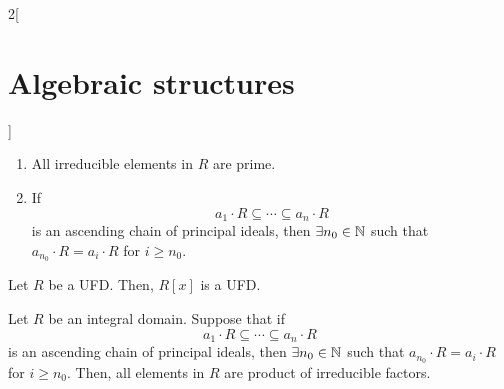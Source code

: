 \documentclass[../../../main.tex]{subfiles}
\begin{document}
\begin{multicols}{2}[\section{Algebraic structures}]
\begin{theorem}
\begin{enumerate}
        \item All irreducible elements in $R$ are prime.
        \item If $$a_1\cdot R\subseteq\cdots\subseteq a_n\cdot R $$ is an ascending chain of principal ideals, then $\exists n_0\in\mathbb{N}$ such that $a_{n_0}\cdot R=a_i\cdot R$ for $i\geq n_0$.
    \end{enumerate}
\end{theorem}
\begin{theorem}
    Let $R$ be a UFD. Then, $R[x]$ is a UFD.
\end{theorem}
\begin{theorem}
    Let $R$ be an integral domain. Suppose that if $$a_1\cdot R\subseteq\cdots\subseteq a_n\cdot R $$ is an ascending chain of principal ideals, then $\exists n_0\in\mathbb{N}$ such that $a_{n_0}\cdot R=a_i\cdot R$ for $i\geq n_0$. Then, all elements in $R$ are product of irreducible factors.
\end{theorem}

\end{multicols}
\end{document}
